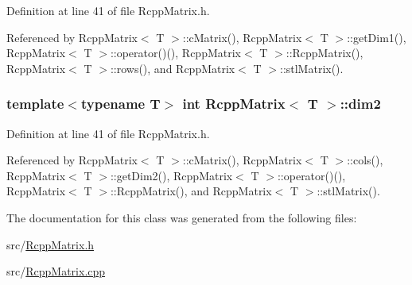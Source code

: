 Definition at line 41 of file RcppMatrix.h.

Referenced by RcppMatrix$<$ T $>$::cMatrix(), RcppMatrix$<$ T $>$::getDim1(), RcppMatrix$<$ T $>$::operator()(), RcppMatrix$<$ T $>$::RcppMatrix(), RcppMatrix$<$ T $>$::rows(), and RcppMatrix$<$ T $>$::stlMatrix().\hypertarget{classRcppMatrix_ad01bc64d89dcc475f7c90f1580bf5d52}{
\subsubsection[{dim2}]{\setlength{\rightskip}{0pt plus 5cm}template$<$typename T$>$ int {\bf RcppMatrix}$<$ T $>$::{\bf dim2}}}
\label{classRcppMatrix_ad01bc64d89dcc475f7c90f1580bf5d52}


Definition at line 41 of file RcppMatrix.h.

Referenced by RcppMatrix$<$ T $>$::cMatrix(), RcppMatrix$<$ T $>$::cols(), RcppMatrix$<$ T $>$::getDim2(), RcppMatrix$<$ T $>$::operator()(), RcppMatrix$<$ T $>$::RcppMatrix(), and RcppMatrix$<$ T $>$::stlMatrix().

The documentation for this class was generated from the following files:\begin{DoxyCompactItemize}
\item 
src/\hyperlink{RcppMatrix_8h}{RcppMatrix.h}\item 
src/\hyperlink{RcppMatrix_8cpp}{RcppMatrix.cpp}\end{DoxyCompactItemize}
